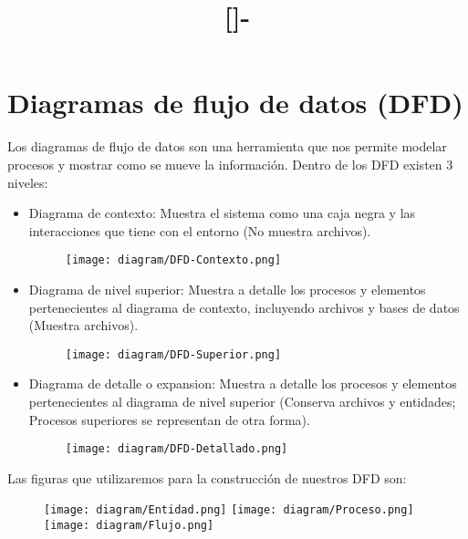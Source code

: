 \documentclass{templateNote}
\begin{document}

\title{[\asignatura]-\titulo}
\author{
    \autor
}
\portada
\margenes %

\section{Diagramas de flujo de datos (\textbf{DFD})} 
\noindent Los diagramas de flujo de datos son una herramienta que nos permite modelar procesos y mostrar como se mueve la información. Dentro de los DFD existen 3 niveles:
\begin{itemize}
    \item Diagrama de contexto: Muestra el sistema como una caja negra y las interacciones que tiene con el entorno (No muestra archivos).
    \begin{figure}[H]
        \centering
        \texttt{[image: diagram/DFD-Contexto.png]}
    \end{figure}

    \item Diagrama de nivel superior: Muestra a detalle los procesos y elementos pertenecientes al diagrama de contexto, incluyendo archivos y bases de datos (Muestra archivos).
    \begin{figure}[H]
        \centering
        \texttt{[image: diagram/DFD-Superior.png]}
    \end{figure}
    
    \item Diagrama de detalle o expansion: Muestra a detalle los procesos y elementos pertenecientes al diagrama de nivel superior (Conserva archivos y entidades; Procesos superiores se representan de otra forma).
    \begin{figure}[H]
        \centering
        \texttt{[image: diagram/DFD-Detallado.png]}
    \end{figure}
\end{itemize}

\newpage
Las figuras que utilizaremos para la construcción de nuestros DFD son:
\begin{figure}[H]
    \centering
    \texttt{[image: diagram/Entidad.png]}\hspace{1.5cm}
    \texttt{[image: diagram/Proceso.png]}\hspace{1.5cm}
    \texttt{[image: diagram/Flujo.png]}\hspace{1.5cm}
\end{figure}
\end{document}
